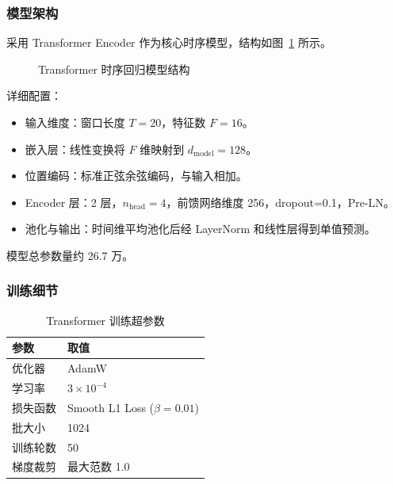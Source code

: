\documentclass[12pt,a4paper]{ctexart}
\begin{document}
	\subsubsection{模型架构}
	采用 Transformer Encoder 作为核心时序模型，结构如图~\ref{fig:arch} 所示。
	
	\begin{figure}[H]
		\centering
		\caption{Transformer 时序回归模型结构}
		\label{fig:arch}
	\end{figure}
	
	详细配置：
	\begin{itemize}
		\item 输入维度：窗口长度 \(T=20\)，特征数 \(F=16\)。
		\item 嵌入层：线性变换将 \(F\) 维映射到 \(d_{\text{model}}=128\)。
		\item 位置编码：标准正弦余弦编码，与输入相加。
		\item Encoder 层：2 层，\(n_{\text{head}}=4\)，前馈网络维度 256，dropout=0.1，Pre-LN。
		\item 池化与输出：时间维平均池化后经 LayerNorm 和线性层得到单值预测。
	\end{itemize}
	模型总参数量约 26.7 万。
	
	\subsubsection{训练细节}
	\begin{table}[H]
		\centering
		\caption{Transformer 训练超参数}
		\label{tab:hyper_trans}
		\begin{tabular}{ll}
			\toprule
			参数 & 取值 \\
			\midrule
			优化器 & AdamW \\
			学习率 & \(3\times10^{-4}\) \\
			损失函数 & Smooth L1 Loss (\(\beta=0.01\)) \\
			批大小 & 1024 \\
			训练轮数 & 50 \\
			梯度裁剪 & 最大范数 1.0 \\
			\bottomrule
		\end{tabular}
	\end{table}
	
\end{document}
